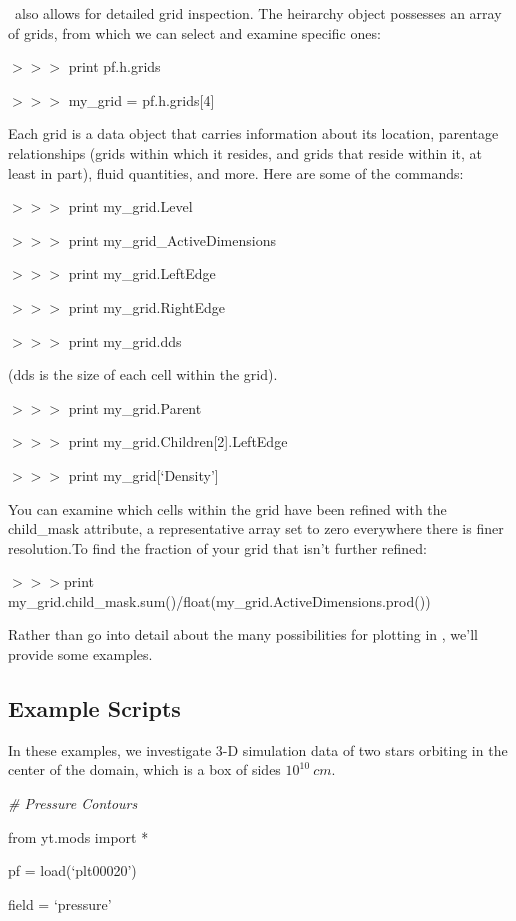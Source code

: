 \yt\ also allows for detailed grid inspection. The heirarchy object
possesses an array of grids, from which we can select and examine
specific ones:

{\scriptsize$>>>$} print pf.h.grids

{\scriptsize$>>>$} my\_grid = pf.h.grids[4]

Each grid is a data object that carries information about its
location, parentage relationships (grids within which it resides, and
grids that reside within it, at least in part), fluid quantities, and
more. Here are some of the commands:

{\scriptsize$>>>$} print my\_grid.Level

{\scriptsize$>>>$} print my\_grid\_ActiveDimensions

{\scriptsize$>>>$} print my\_grid.LeftEdge

{\scriptsize$>>>$} print my\_grid.RightEdge

{\scriptsize$>>>$} print my\_grid.dds

(dds is the size of each cell within the grid).

{\scriptsize$>>>$} print my\_grid.Parent

{\scriptsize$>>>$} print my\_grid.Children[2].LeftEdge

{\scriptsize$>>>$} print my\_grid[`Density']

You can examine which cells within the grid have been refined with the
child\_mask attribute, a representative array set to zero everywhere
there is finer resolution.To find the fraction of your grid that isn't
further refined:

{\scriptsize$>>>$}print my\_grid.child\_mask.sum()/float(my\_grid.ActiveDimensions.prod())

Rather than go into detail about the many possibilities for plotting
in \yt, we'll provide some examples.

\subsection{Example Scripts}

In these examples, we investigate 3-D simulation data of two stars
orbiting in the center of the domain, which is a box of sides
$10^{10}\:cm$.


{\it\# Pressure Contours}
{\setlength{\parskip}{0pt}

from yt.mods import *
}

pf = load(`plt00020')

field = `pressure'

